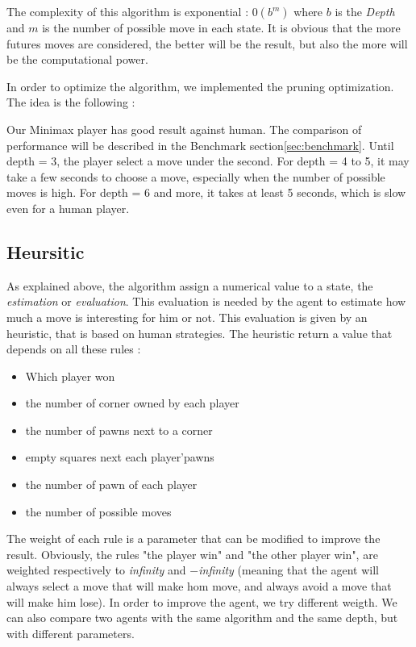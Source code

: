 \documentclass{article}
\begin{document}
The complexity of this algorithm is exponential : $0(b^m)$ where $b$ is the \textit{Depth} and $m$ is the number of possible move in each state.
It is obvious that the more futures moves are considered, the better will be the result, but also the more will be the computational power.

In order to optimize the algorithm, we implemented the pruning optimization. The idea is the following :

Our Minimax player has good result against human. The comparison of performance will be described in the Benchmark section\ref{sec:benchmark}.
Until depth = 3, the player select a move under the second.
For depth = 4 to 5, it may take a few seconds to choose a move, especially when the number of possible moves is high.
For depth = 6 and more, it takes at least 5 seconds, which is slow even for a human player.

\subsection{Heursitic}
As explained above, the algorithm assign a numerical value to a state, the \textit{estimation} or \textit{evaluation}. This evaluation is needed by the agent to estimate how much a move is interesting for him %
or not. This evaluation is given by an heuristic, that is based on human strategies.
The heuristic return a value that depends on all these rules :
\begin{itemize}
    \item Which player won
    \item the number of corner owned by each player
    \item the number of pawns next to a corner
    \item empty squares next each player'pawns
    \item the number of pawn of each player
    \item the number of possible moves
\end{itemize}
The weight of each rule is a parameter that can be modified to improve the result. Obviously, the rules "the player win" and "the other player win", are weighted respectively
to \textit{infinity} and $-$\textit{infinity} (meaning that the agent will always select a move that will make hom move, and always avoid a move that will make him lose).
In order to improve the agent, we try different weigth. We can also compare two agents with the same algorithm and the same depth, but with different parameters.
\end{document}
